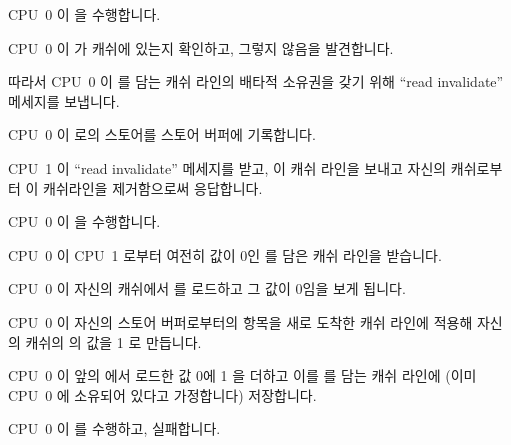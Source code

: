 \begin{sequence}
\item	CPU~0 이  을 수행합니다.
\item	CPU~0 이  가 캐쉬에 있는지 확인하고, 그렇지 않음을 발견합니다.
\item	따라서 CPU~0 이  를 담는 캐쉬 라인의 배타적 소유권을 갖기 위해
	``read invalidate'' 메세지를 보냅니다.
\item	CPU~0 이  로의 스토어를 스토어 버퍼에 기록합니다.
\item	CPU~1 이 ``read invalidate'' 메세지를 받고, 이 캐쉬 라인을 보내고
	자신의 캐쉬로부터 이 캐쉬라인을 제거함으로써 응답합니다.
\item	CPU~0 이  을 수행합니다.
\item	CPU~0 이 CPU~1 로부터 여전히 값이 0인  를 담은 캐쉬 라인을
	받습니다.
\item	CPU~0 이 자신의 캐쉬에서  를 로드하고 그 값이 0임을 보게 됩니다.
	\label{item:app:whymb:Need Store Buffer}
\item	CPU~0 이 자신의 스토어 버퍼로부터의 항목을 새로 도착한 캐쉬 라인에
	적용해 자신의 캐쉬의  의 값을 1 로 만듭니다.
\item	CPU~0 이 앞의  에서 로드한 값 0에 1 을 더하고 이를  를
	담는 캐쉬 라인에 (이미 CPU~0 에 소유되어 있다고 가정합니다) 저장합니다.
\item	CPU~0 이  를 수행하고, 실패합니다.

\iffalse

\item	CPU~0 starts executing the \co{a = 1}.
\item	CPU~0 looks \qco{a} up in the cache, and finds that it is missing.
\item	CPU~0 therefore sends a ``read invalidate'' message in order to
	get exclusive ownership of the cache line containing \qco{a}.
\item	CPU~0 records the store to \qco{a} in its store buffer.
\item	CPU~1 receives the ``read invalidate'' message, and responds
	by transmitting the cache line and removing that cacheline from
	its cache.
\item	CPU~0 starts executing the \co{b = a + 1}.
\item	CPU~0 receives the cache line from CPU~1, which still has
	a value of zero for \qco{a}.
\item	CPU~0 loads \qco{a} from its cache, finding the value zero.
	\label{item:app:whymb:Need Store Buffer}
\item	CPU~0 applies the entry from its store buffer to the newly
	arrived cache line, setting the value of \qco{a} in its cache
	to one.
\item	CPU~0 adds one to the value zero loaded for \qco{a} above,
	and stores it into the cache line containing \qco{b}
	(which we will assume is already owned by CPU~0).
\item	CPU~0 executes \co{assert(b == 2)}, which fails.

\fi

\end{sequence}


